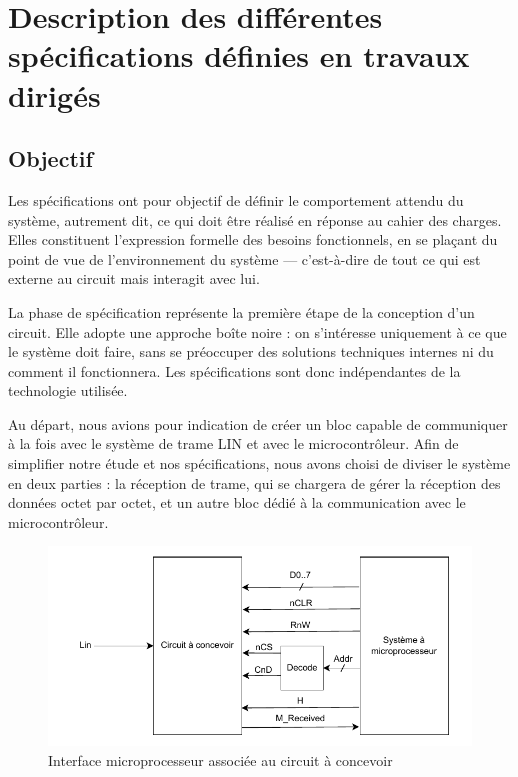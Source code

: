 \section{Description des différentes spécifications définies en travaux dirigés}

\subsection*{Objectif}

Les spécifications ont pour objectif de définir le comportement attendu du système, autrement dit, ce qui doit être réalisé en réponse au cahier des charges. Elles constituent l’expression formelle des besoins fonctionnels, en se plaçant du point de vue de l’environnement du système — c’est-à-dire de tout ce qui est externe au circuit mais interagit avec lui.
\newline

La phase de spécification représente la première étape de la conception d’un circuit. Elle adopte une approche boîte noire : on s’intéresse uniquement à ce que le système doit faire, sans se préoccuper des solutions techniques internes ni du comment il fonctionnera. Les spécifications sont donc indépendantes de la technologie utilisée.
\newline

Au départ, nous avions pour indication de créer un bloc capable de communiquer à la fois avec le système de trame LIN et avec le microcontrôleur. Afin de simplifier notre étude et nos spécifications, nous avons choisi de diviser le système en deux parties : la réception de trame, qui se chargera de gérer la réception des données octet par octet, et un autre bloc dédié à la communication avec le microcontrôleur.
\newline

\begin{figure}[H]
   \centering
   \includegraphics[width=0.8\linewidth]{images/CDC/Schema_cdc_final.pdf}
   \caption{Interface microprocesseur associée au circuit à concevoir}
   \label{fig:placeholder}
\end{figure}
    

